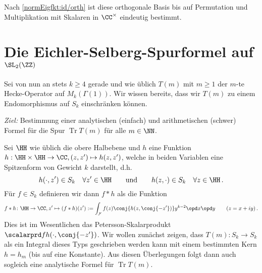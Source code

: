 \begin{beme}
Nach \autoref{normEigfkt:id/orth} ist diese orthogonale Basis bis auf Permutation und Multiplikation mit Skalaren in $\CC^\times$ eindeutig bestimmt.
\end{beme}



\chapter{Die Eichler-Selberg-Spurformel auf $\SL_2(\ZZ)$}

Sei von nun an stets $k \geq 4$ gerade und wie üblich $T(m)$ mit $m \geq 1$ der $m$-te Hecke-Operator auf $M_k (\Gamma(1))$. Wir wissen bereits, dass wir $T(m)$ zu einem Endomorphismus auf $S_k$ einschränken können.

\emph{Ziel:} Bestimmung einer analytischen (einfach) und arithmetischen (schwer) Formel für die Spur $\operatorname{Tr} T(m)$ für alle $m \in \NN$.

Sei $\HH$ wie üblich die obere Halbebene und $h$ eine Funktion $h: \HH \times \HH \to \CC, (z, z') \mapsto h(z, z')$, welche in beiden Variablen eine Spitzenform von Gewicht $k$ darstellt, d.h. 
\[
	h(\cdot, z') \in S_k \quad \forall z' \in \HH \qquad \text{und} \qquad h(z, \cdot) \in S_k \quad \forall z \in \HH
	\,.
\]
Für $f \in S_k$ definieren wir dann $f \ast h$ als die Funktion
\[
	f \ast h \colon \HH \to \CC, z' \mapsto (f \ast h)(z') := \int_{\mathcal F} f(z) \conj{ h(z, \conj{-z'})} y^{k-2} \opd x \opd y \qquad (z = x + iy)
	\,.
\]
Dies ist im Wesentlichen das Petersson-Skalarprodukt $\scalarprd f{h(\cdot, \conj{-z'})}$. Wir wollen zunächst zeigen, dass $T(m) \colon S_k \to S_k$ als ein Integral dieses Typs geschrieben werden kann mit einem bestimmten Kern $h = h_m$ (bis auf eine Konstante). Aus diesen Überlegungen folgt dann auch sogleich eine analytische Formel für $\operatorname{Tr} T(m)$.
